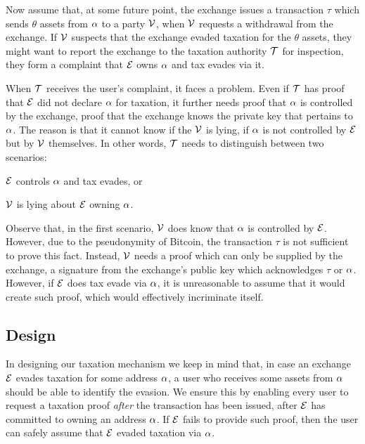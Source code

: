 Now assume that, at some future point, the exchange issues a transaction $\tau$
which sends $\theta$ assets from $\alpha$ to a party $\mathcal{V}$, \eg when
$\mathcal{V}$ requests a withdrawal from the exchange. If $\mathcal{V}$ suspects that the
exchange evaded taxation for the $\theta$ assets, they might want to report the
exchange to the taxation authority $\mathcal{T}$ for inspection, \ie they form a
complaint that $\mathcal{E}$ owns $\alpha$ and tax evades via it.

When $\mathcal{T}$ receives the user's complaint, it faces a problem. Even if
$\mathcal{T}$ has proof that $\mathcal{E}$ did not declare $\alpha$ for taxation,
it further needs proof that $\alpha$ is controlled by the exchange, \ie proof
that the exchange knows the private key that pertains to $\alpha$. The reason
is that it cannot know if the $\mathcal{V}$ is lying, \ie if $\alpha$ is not
controlled by $\mathcal{E}$ but by $\mathcal{V}$ themselves. In other words, $\mathcal{T}$
needs to distinguish between two scenarios:
\begin{inparaenum}[i)]
    \item $\mathcal{E}$ controls $\alpha$ and tax evades, or
    \item $\mathcal{V}$ is lying about $\mathcal{E}$ owning $\alpha$.
\end{inparaenum}

Observe that, in the first scenario, $\mathcal{V}$ does know that $\alpha$ is
controlled by $\mathcal{E}$. However, due to the pseudonymity of Bitcoin, the
transaction $\tau$ is not sufficient to prove this fact. Instead, $\mathcal{V}$
needs a proof which can only be supplied by the exchange, \eg a signature from
the exchange's public key which acknowledges $\tau$ or $\alpha$. However, if
$\mathcal{E}$ does tax evade via $\alpha$, it is unreasonable to assume that it
would create such proof, which would effectively incriminate itself.

\subsection{Design}\label{subsec:tax-design}

In designing our taxation mechanism we keep in mind that, in case an exchange
$\mathcal{E}$ evades taxation for some address $\alpha$, a user who receives
some assets from $\alpha$ should be able to identify the evasion.  We ensure
this by enabling every user to request a taxation proof \emph{after} the
transaction has been issued, \ie after $\mathcal{E}$ has committed to owning an
address $\alpha$. If $\mathcal{E}$ fails to provide such proof, then the user
can safely assume that $\mathcal{E}$ evaded taxation via $\alpha$.

